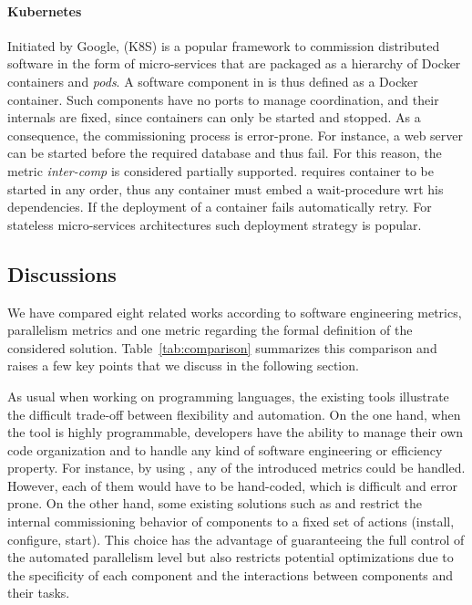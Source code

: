 \paragraph{Kubernetes}
Initiated by Google, \kubernetes (K8S) is a popular framework to commission distributed software in the form of micro-services that are packaged as a hierarchy of Docker containers and \emph{pods}. A software component in \kubernetes is thus defined as a Docker container. Such components have no ports to manage coordination, and their internals are fixed, since containers can only be started and stopped. As a consequence, the commissioning process is error-prone. For instance, a web server can be started before the required database and thus fail. For this reason, the metric \emph{inter-comp} is considered partially supported. \kubernetes requires container to be started in any order, thus any container must embed a wait-procedure wrt his dependencies. If the deployment of a container fails \kubernetes automatically retry. For stateless micro-services architectures such deployment strategy is popular.

\subsection{Discussions}

We have compared eight related works according to software engineering metrics, parallelism metrics and one metric regarding the formal definition of the considered solution. Table~\ref{tab:comparison} summarizes this comparison and raises a few key points that we discuss in the following section.

As usual when working on programming languages, the existing tools illustrate the difficult trade-off between flexibility and automation. On the one hand, when the tool is highly programmable, developers have the ability to manage their own code organization and to handle any kind of software engineering or efficiency property. For instance, by using \shell, any of the introduced metrics could be handled. However, each of them would have to be hand-coded, which is difficult and error prone. On the other hand, some existing solutions such as \deployware and \juju restrict the internal commissioning behavior of components to a fixed set of actions (\eg install, configure, start). This choice has the advantage of guaranteeing the full control of the automated parallelism level but also restricts potential optimizations due to the specificity of each component and the interactions between components and their tasks.

